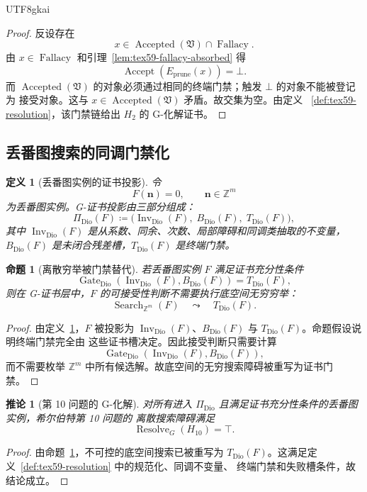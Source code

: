 \documentclass[12pt]{article}
\newtheorem{definition}{定义}[section]
\newtheorem{proposition}{命题}[section]
\newtheorem{corollary}{推论}[section]
\newcommand{\ZZ}{\mathbb{Z}}
\newcommand{\Vsys}{\mathfrak V}
\newcommand{\DefEq}{\coloneqq}
\DeclareMathOperator{\Accept}{Accept}
\DeclareMathOperator{\Accepted}{Accepted}
\DeclareMathOperator{\Fallacy}{Fallacy}
\DeclareMathOperator{\Resolve}{Resolve}
\DeclareMathOperator{\Gate}{Gate}
\DeclareMathOperator{\Inv}{Inv}
\DeclareMathOperator{\Dio}{Dio}
\DeclareMathOperator{\Search}{Search}
\begin{document}
\begin{CJK*}{UTF8}{gkai}
\begin{proof}
反设存在
\[
  x\in \Accepted(\Vsys)\cap\Fallacy.
\]
由 \(x\in\Fallacy\) 和引理~\ref{lem:tex59-fallacy-absorbed} 得
\[
  \Accept(E_{\mathrm{prune}}(x))=\bot.
\]
而 \(\Accepted(\Vsys)\) 的对象必须通过相同的终端门禁；触发 \(\bot\) 的对象不能被登记为
接受对象。这与 \(x\in\Accepted(\Vsys)\) 矛盾。故交集为空。由定义
~\ref{def:tex59-resolution}，该门禁链给出 \(H_2\) 的 G-化解证书。
\end{proof}

\subsection{丢番图搜索的同调门禁化}
\label{subsec:tex59-diophantine}

\begin{definition}[丢番图实例的证书投影]
\label{def:tex59-diophantine-projection}
令
\[
  F(\mathbf n)=0,\qquad \mathbf n\in\ZZ^m
\]
为丢番图实例。G-证书投影由三部分组成：
\[
  \Pi_{\Dio}(F)
  \DefEq
  \bigl(
    \Inv_{\Dio}(F),\;
    B_{\Dio}(F),\;
    T_{\Dio}(F)
  \bigr),
\]
其中 \(\Inv_{\Dio}(F)\) 是从系数、同余、次数、局部障碍和同调类抽取的不变量，
\(B_{\Dio}(F)\) 是未闭合残差槽，\(T_{\Dio}(F)\) 是终端门禁。
\end{definition}

\begin{proposition}[离散穷举被门禁替代]
\label{prop:tex59-diophantine-gate}
若丢番图实例 \(F\) 满足证书充分性条件
\[
  \Gate_{\Dio}(\Inv_{\Dio}(F),B_{\Dio}(F))
  =
  T_{\Dio}(F),
\]
则在 G-证书层中，\(F\) 的可接受性判断不需要执行底空间无穷穷举：
\[
  \Search_{\ZZ^m}(F)
  \quad\leadsto\quad
  T_{\Dio}(F).
\]
\end{proposition}

\begin{proof}
由定义~\ref{def:tex59-diophantine-projection}，\(F\) 被投影为
\(\Inv_{\Dio}(F)\)、\(B_{\Dio}(F)\) 与 \(T_{\Dio}(F)\)。命题假设说明终端门禁完全由
这些证书槽决定。因此接受判断只需要计算
\[
  \Gate_{\Dio}(\Inv_{\Dio}(F),B_{\Dio}(F)),
\]
而不需要枚举 \(\ZZ^m\) 中所有候选解。故底空间的无穷搜索障碍被重写为证书门禁。
\end{proof}

\begin{corollary}[第 10 问题的 G-化解]
\label{cor:tex59-h10}
对所有进入 \(\Pi_{\Dio}\) 且满足证书充分性条件的丢番图实例，希尔伯特第 10 问题的
离散搜索障碍满足
\[
  \Resolve_G(H_{10})=\top.
\]
\end{corollary}

\begin{proof}
由命题~\ref{prop:tex59-diophantine-gate}，不可控的底空间搜索已被重写为
\(T_{\Dio}(F)\)。这满足定义~\ref{def:tex59-resolution} 中的规范化、同调不变量、
终端门禁和失败槽条件，故结论成立。
\end{proof}


\end{CJK*}
\end{document}

